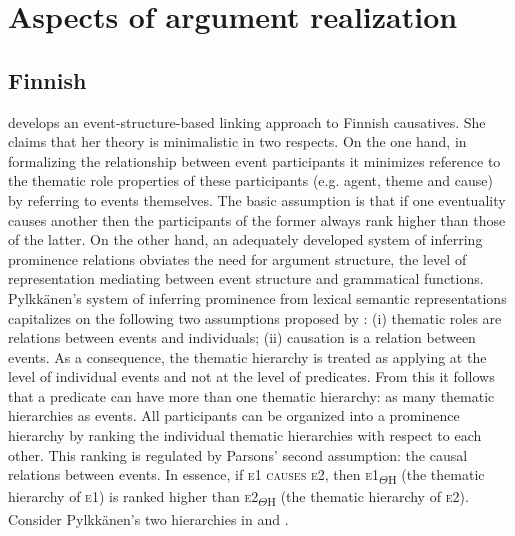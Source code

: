 \documentclass[output=paper,hidelinks]{langscibook}
\begin{document}
\section{Aspects of argument realization}
\label{sec:FinnoUgric:6}
\subsection{Finnish}
\label{sec:FinnoUgric:6.1}

\citet{Pylkkanen1997} develops an event-structure-based linking approach to Finnish causatives. She claims that her theory is minimalistic in two respects. On the one hand, in formalizing the relationship between event participants it minimizes reference to the thematic role properties of these participants (e.g. agent, theme and cause) by referring to events themselves. The basic assumption is that if one eventuality causes another then the participants of the former always rank higher than those of the latter. On the other hand, an adequately developed system of inferring prominence relations obviates the need for argument structure, the level of representation mediating between event structure and grammatical functions. Pylkkänen's system of inferring prominence from lexical semantic representations capitalizes on the following two assumptions proposed by \citet{parsons1990events}: (i) thematic roles are relations between events and individuals; (ii) causation is a relation between events. As a consequence, the thematic hierarchy is treated as applying at the level of individual events and not at the level of predicates. From this it follows that a predicate can have more than one thematic hierarchy: as many thematic hierarchies as events. All participants can be organized into a prominence hierarchy by ranking the individual thematic hierarchies with respect to each other. This ranking is regulated by Parsons' second assumption: the causal relations between events. In essence, if \textsc{e}1 \textsc{causes} \textsc{e2}, then \textsc{e1}\textsubscript{${\Theta}$H} (the thematic hierarchy of \textsc{e1}) is ranked higher than \textsc{e2}\textsubscript{${\Theta}$H} (the thematic hierarchy of \textsc{e2}). Consider Pylkkänen's two hierarchies in  and .


\ea%
    \label{ex:FinnoUgric:22}
    \z

          

\ea%
    \label{ex:FinnoUgric:23}
    \z
\end{document}
